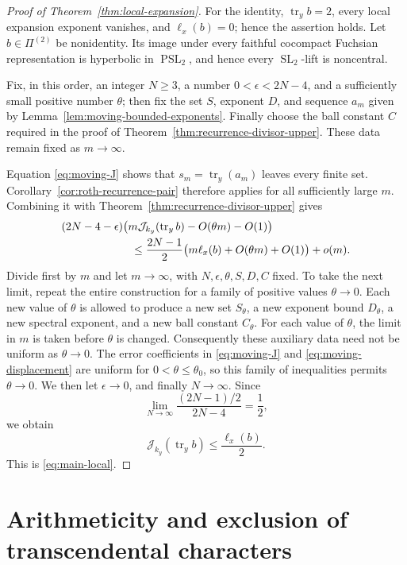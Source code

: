 \documentclass[11pt,reqno]{amsart}
\theoremstyle{definition}
\theoremstyle{remark}
\newcommand{\cJ}{\mathcal J}
\newcommand{\Tr}{\operatorname{tr}}
\newcommand{\SL}{\operatorname{SL}}
\newcommand{\PSL}{\operatorname{PSL}}
\begin{document}
\begin{proof}[Proof of Theorem~\ref{thm:local-expansion}]
For the identity, \(\Tr_y b=2\), every local expansion exponent vanishes,
and \(\ell_x(b)=0\); hence the assertion holds.  Let
\(b\in\Pi^{(2)}\) be
nonidentity.  Its image under every faithful cocompact Fuchsian
representation is hyperbolic in \(\PSL_2\), and hence every
\(\SL_2\)-lift is noncentral.

Fix, in this order, an integer \(N\ge3\), a number
\(0<\epsilon<2N-4\), and a sufficiently small positive number \(\theta\);
then fix the set
\(S\), exponent \(D\), and sequence \(a_m\) given by
Lemma~\ref{lem:moving-bounded-exponents}.  Finally choose the ball constant
\(C\) required in the proof of
Theorem~\ref{thm:recurrence-divisor-upper}.  These data remain fixed as
\(m\to\infty\).

Equation \eqref{eq:moving-J} shows that \(s_m=\Tr_y(a_m)\) leaves every
finite set.  Corollary~\ref{cor:roth-recurrence-pair} therefore applies for
all sufficiently large \(m\).  Combining it with
Theorem~\ref{thm:recurrence-divisor-upper} gives
\begin{align*}
 &(2N-4-\epsilon)
 \bigl(m\cJ_{k_y}(\Tr_y b)-O(\theta m)-O(1)\bigr)\\
 &\hspace{22mm}\le
 \frac{2N-1}{2}
 \bigl(m\ell_x(b)+O(\theta m)+O(1)\bigr)+o(m).
\end{align*}
Divide first by \(m\) and let \(m\to\infty\), with
\(N,\epsilon,\theta,S,D,C\) fixed.  To take the next limit, repeat the
entire construction for a family of positive values \(\theta\to0\).  Each
new value of \(\theta\) is allowed to produce a new set \(S_\theta\), a new
exponent bound \(D_\theta\), a new spectral exponent, and a new ball
constant \(C_\theta\).  For each value of \(\theta\), the limit in \(m\)
is taken before \(\theta\) is changed.  Consequently these auxiliary data
need not be uniform as \(\theta\to0\).  The error coefficients in
\eqref{eq:moving-J} and \eqref{eq:moving-displacement} are uniform for
\(0<\theta\le\theta_0\), so this family of inequalities permits
\(\theta\to0\).  We then let \(\epsilon\to0\), and finally
\(N\to\infty\).  Since
\[
 \lim_{N\to\infty}\frac{(2N-1)/2}{2N-4}=\frac12,
\]
we obtain
\[
 \cJ_{k_y}(\Tr_y b)\le\frac{\ell_x(b)}2.
\]
This is \eqref{eq:main-local}.
\end{proof}

\section{Arithmeticity and exclusion of transcendental characters}
\label{sec:arithmeticity}
\end{document}
